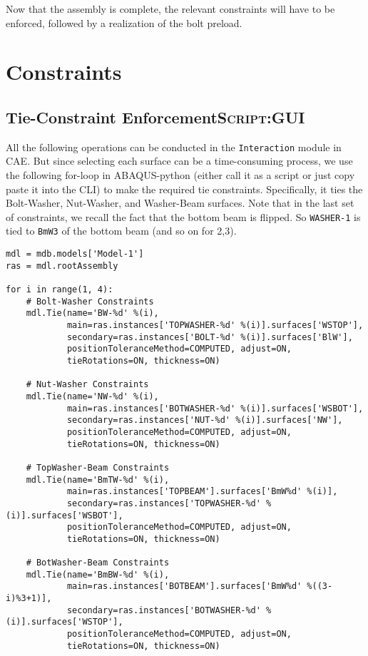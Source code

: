 \documentclass[11pt]{article}
\begin{document}
Now that the assembly is complete, the relevant constraints will have to be enforced, followed by a realization of the bolt preload.
\pagebreak
\section{Constraints}
\label{sec:constr}
\subsection{Tie-Constraint Enforcement\hfill{}\textsc{Script:GUI}}
\label{sec:orgb69cdb3}
All the following operations can be conducted in the \texttt{Interaction} module in CAE.
But since selecting each surface can be a time-consuming process, we use the following for-loop in ABAQUS-python (either call it as a script or just copy paste it into the CLI) to make the required tie constraints.
Specifically, it ties the Bolt-Washer, Nut-Washer, and Washer-Beam surfaces.
Note that in the last set of constraints, we recall the fact that the bottom beam is flipped.
So \texttt{WASHER-1} is tied to \texttt{BmW3} of the bottom beam (and so on for 2,3).
\begin{verbatim}
mdl = mdb.models['Model-1']
ras = mdl.rootAssembly

for i in range(1, 4):
    # Bolt-Washer Constraints
    mdl.Tie(name='BW-%d' %(i),
            main=ras.instances['TOPWASHER-%d' %(i)].surfaces['WSTOP'],
            secondary=ras.instances['BOLT-%d' %(i)].surfaces['BlW'],
            positionToleranceMethod=COMPUTED, adjust=ON,
            tieRotations=ON, thickness=ON)

    # Nut-Washer Constraints
    mdl.Tie(name='NW-%d' %(i),
            main=ras.instances['BOTWASHER-%d' %(i)].surfaces['WSBOT'],
            secondary=ras.instances['NUT-%d' %(i)].surfaces['NW'],
            positionToleranceMethod=COMPUTED, adjust=ON,
            tieRotations=ON, thickness=ON)

    # TopWasher-Beam Constraints
    mdl.Tie(name='BmTW-%d' %(i),
            main=ras.instances['TOPBEAM'].surfaces['BmW%d' %(i)],
            secondary=ras.instances['TOPWASHER-%d' %(i)].surfaces['WSBOT'],
            positionToleranceMethod=COMPUTED, adjust=ON,
            tieRotations=ON, thickness=ON)

    # BotWasher-Beam Constraints
    mdl.Tie(name='BmBW-%d' %(i),
            main=ras.instances['BOTBEAM'].surfaces['BmW%d' %((3-i)%3+1)],
            secondary=ras.instances['BOTWASHER-%d' %(i)].surfaces['WSTOP'],
            positionToleranceMethod=COMPUTED, adjust=ON,
            tieRotations=ON, thickness=ON)
\end{verbatim}
\end{document}
